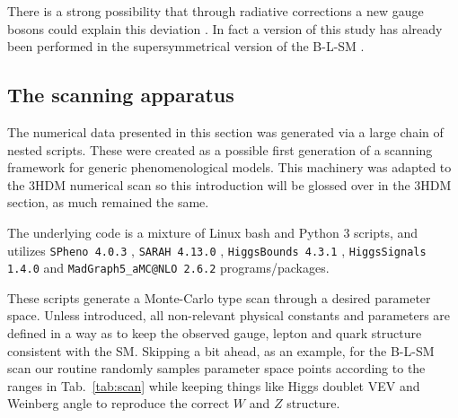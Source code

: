 There is a strong possibility that through radiative corrections a new gauge bosons could explain this deviation \cite{Czarnecki:2001pv}. In fact a version of this study has already been performed in the supersymmetrical version of the B-L-SM \cite{Khalil:2015wua,Yang:2018guw}. 


\subsection{The scanning apparatus}

The numerical data presented in this section was generated via a large chain of nested scripts. These were created as a possible first generation of a scanning framework for generic phenomenological models. This machinery was adapted to the 3HDM numerical scan so this introduction will be glossed over in the 3HDM section, as much remained the same. 

The underlying code is a mixture of Linux bash and Python 3 scripts, and utilizes \texttt{SPheno 4.0.3} \cite{Porod:2003um,Porod:2011nf},  \texttt{SARAH 4.13.0} \cite{Staub:2008uz,Staub:2013tta}, \texttt{HiggsBounds 4.3.1} \cite{Bechtle:2013wla}, \texttt{HiggsSignals 1.4.0} \cite{Bechtle:2013xfa} and \texttt{MadGraph5\_aMC@NLO 2.6.2} \cite{Alwall:2014hca} programs/packages. 

These scripts generate a Monte-Carlo type scan through a desired parameter space. Unless introduced, all non-relevant physical constants and parameters are defined in a way as to keep the observed gauge, lepton and quark structure consistent with the SM. Skipping a bit ahead, as an example, for the B-L-SM scan our  routine randomly samples parameter space points according to the ranges in Tab.~\ref{tab:scan} while keeping things like Higgs doublet VEV and Weinberg angle to reproduce the correct 
$W$ and $Z$ structure.

